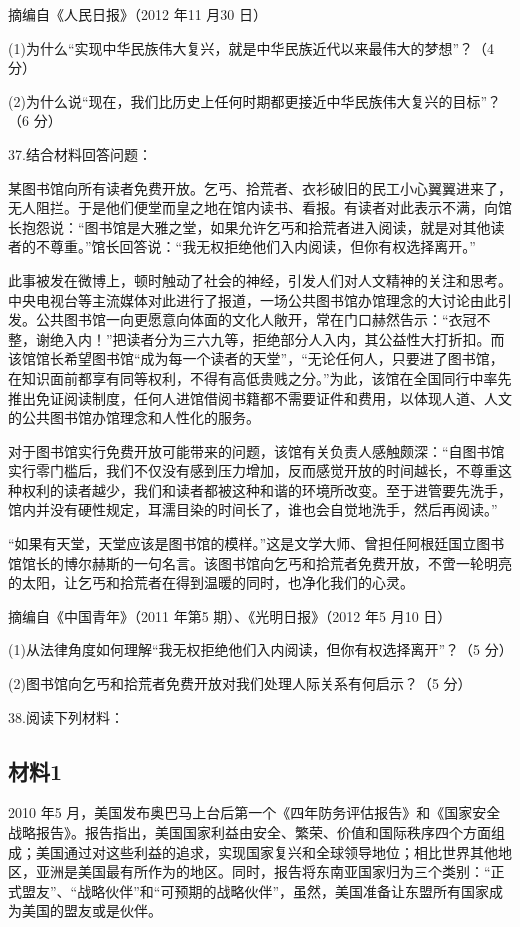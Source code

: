 \documentclass[UTF8,11pt]{ctexart}
\begin{document}
摘编自《人民日报》（2012 年11 月30 日）

(1)为什么“实现中华民族伟大复兴，就是中华民族近代以来最伟大的梦想”？（4 分）


(2)为什么说“现在，我们比历史上任何时期都更接近中华民族伟大复兴的目标”？（6 分）


37.结合材料回答问题：

某图书馆向所有读者免费开放。乞丐、拾荒者、衣衫破旧的民工小心翼翼进来了，无人阻拦。于是他们便堂而皇之地在馆内读书、看报。有读者对此表示不满，向馆长抱怨说：“图书馆是大雅之堂，如果允许乞丐和拾荒者进入阅读，就是对其他读者的不尊重。”馆长回答说：“我无权拒绝他们入内阅读，但你有权选择离开。”

此事被发在微博上，顿时触动了社会的神经，引发人们对人文精神的关注和思考。中央电视台等主流媒体对此进行了报道，一场公共图书馆办馆理念的大讨论由此引发。公共图书馆一向更愿意向体面的文化人敞开，常在门口赫然告示：“衣冠不整，谢绝入内！”把读者分为三六九等，拒绝部分人入内，其公益性大打折扣。而该馆馆长希望图书馆“成为每一个读者的天堂”，“无论任何人，只要进了图书馆，在知识面前都享有同等权利，不得有高低贵贱之分。”为此，该馆在全国同行中率先推出免证阅读制度，任何人进馆借阅书籍都不需要证件和费用，以体现人道、人文的公共图书馆办馆理念和人性化的服务。

对于图书馆实行免费开放可能带来的问题，该馆有关负责人感触颇深：“自图书馆实行零门槛后，我们不仅没有感到压力增加，反而感觉开放的时间越长，不尊重这种权利的读者越少，我们和读者都被这种和谐的环境所改变。至于进管要先洗手，馆内并没有硬性规定，耳濡目染的时间长了，谁也会自觉地洗手，然后再阅读。”

“如果有天堂，天堂应该是图书馆的模样。”这是文学大师、曾担任阿根廷国立图书馆馆长的博尔赫斯的一句名言。该图书馆向乞丐和拾荒者免费开放，不啻一轮明亮的太阳，让乞丐和拾荒者在得到温暖的同时，也净化我们的心灵。

摘编自《中国青年》（2011 年第5 期）、《光明日报》（2012 年5 月10 日）

(1)从法律角度如何理解“我无权拒绝他们入内阅读，但你有权选择离开”？（5 分）


(2)图书馆向乞丐和拾荒者免费开放对我们处理人际关系有何启示？（5 分）


38.阅读下列材料：


\subsection*{材料1}

2010 年5 月，美国发布奥巴马上台后第一个《四年防务评估报告》和《国家安全战略报告》。报告指出，美国国家利益由安全、繁荣、价值和国际秩序四个方面组成；美国通过对这些利益的追求，实现国家复兴和全球领导地位；相比世界其他地区，亚洲是美国最有所作为的地区。同时，报告将东南亚国家归为三个类别：“正式盟友”、“战略伙伴”和“可预期的战略伙伴”，虽然，美国准备让东盟所有国家成为美国的盟友或是伙伴。
\end{document}
